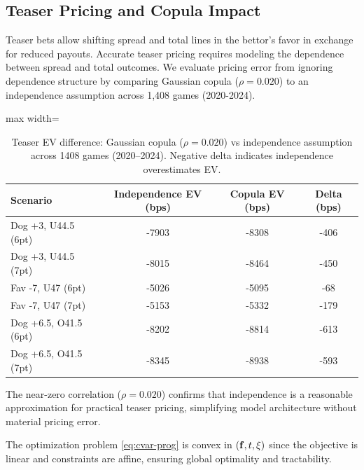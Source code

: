 \subsection{Teaser Pricing and Copula Impact}\label{subsec:teaser-copula}
Teaser bets allow shifting spread and total lines in the bettor's favor in exchange for reduced payouts. Accurate teaser pricing requires modeling the dependence between spread and total outcomes. We evaluate pricing error from ignoring dependence structure by comparing Gaussian copula ($\rho=0.020$) to an independence assumption across 1,408 games (2020-2024).

\begin{table}[t]
    \centering
    \caption[Copula vs independence teaser pricing]{Teaser EV difference: Gaussian copula ($\rho=0.020$) vs independence assumption across 1408 games (2020--2024). Negative delta indicates independence overestimates EV.}
    \label{tab:teaser-copula-impact}
    \begin{adjustbox}{max width=\textwidth}
    \begin{tabular}{lccc}
      \toprule
      \textbf{Scenario} & \textbf{Independence EV (bps)} & \textbf{Copula EV (bps)} & \textbf{Delta (bps)} \\
      \midrule
      Dog +3, U44.5 (6pt) & -7903 & -8308 & -406 \\
      Dog +3, U44.5 (7pt) & -8015 & -8464 & -450 \\
      Fav -7, U47 (6pt) & -5026 & -5095 & -68 \\
      Fav -7, U47 (7pt) & -5153 & -5332 & -179 \\
      Dog +6.5, O41.5 (6pt) & -8202 & -8814 & -613 \\
      Dog +6.5, O41.5 (7pt) & -8345 & -8938 & -593 \\
      \bottomrule
    \end{tabular}
    \end{adjustbox}
  \end{table}

The near-zero correlation ($\rho=0.020$) confirms that independence is a reasonable approximation for practical teaser pricing, simplifying model architecture without material pricing error.

\begin{theorem}
The optimization problem \eqref{eq:cvar-prog} is convex in $(\mathbf{f}, t, \xi)$ since the objective is linear and constraints are affine, ensuring global optimality and tractability.
\end{theorem}

